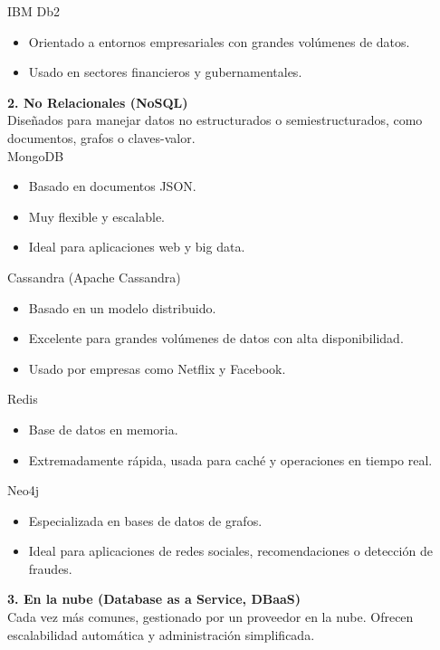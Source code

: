 \documentclass[12pt]{report}
\begin{document}
\begin{enumerate}[label=\roman*.]
\begin{enumerate}[label=\textbf{\arabic*.}, itemsep=2.0em]
IBM Db2
\begin{itemize}
    \item Orientado a entornos empresariales con grandes volúmenes de datos.
    \item Usado en sectores financieros y gubernamentales.
\end{itemize}
\newpage
\textbf{2. No Relacionales (NoSQL)}\\
Diseñados para manejar datos no estructurados o semiestructurados, como documentos, grafos o claves-valor.\\

MongoDB
\begin{itemize}
    \item Basado en documentos JSON.
    \item Muy flexible y escalable.
    \item Ideal para aplicaciones web y big data.
\end{itemize}

Cassandra (Apache Cassandra)
\begin{itemize}
    \item Basado en un modelo distribuido.
    \item Excelente para grandes volúmenes de datos con alta disponibilidad.
    \item Usado por empresas como Netflix y Facebook.
\end{itemize}

Redis
\begin{itemize}
    \item Base de datos en memoria.
    \item Extremadamente rápida, usada para caché y operaciones en tiempo real.
\end{itemize}

Neo4j
\begin{itemize}
    \item Especializada en bases de datos de grafos.
    \item Ideal para aplicaciones de redes sociales, recomendaciones o detección de fraudes.
\end{itemize}

\textbf{3. En la nube (Database as a Service, DBaaS)}\\
Cada vez más comunes, gestionado por un proveedor en la nube. Ofrecen escalabilidad automática y administración simplificada.\\


\end{enumerate}
\end{enumerate}
\end{document}
